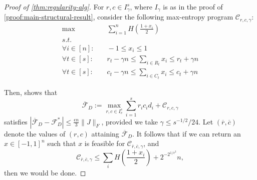 \documentclass[final, 12pt]{colt2018}
\newcommand{\F}{\mathcal{F}}
\theoremstyle{definition}
\theoremstyle{plain}
\begin{document}
\begin{proof}[Proof of \cref{thm:regularity-alg}]
For $r,c \in I^{s}_{\gamma}$, where $I_{\gamma}$ is as in the proof of \cref{proof:main-structural-result}, consider the following max-entropy program $\mathcal{C}_{r,c,\gamma}$: 
\begin{align*}
\max & \quad \sum_{i=1}^{n}H\left(\frac{1+x_{i}}{2}\right)\\
s.t.\\
\forall i\in[n]: & \quad -1\leq x_{i}\leq1 \\
\forall t\in[s]: & \quad r_{t}-\gamma n\leq\sum_{i\in R_{t}}x_{i}\leq r_{t}+\gamma n\\
\forall t\in[s]: & \quad c_{t}-\gamma n\leq\sum_{i\in C_{t}}x_{i}\leq c_{t}+\gamma n
\end{align*}

Then,  shows that  
\[ \overline{\F}_D := \max_{r,c \in I^s_v} \sum_{i = 1}^s r_i c_i d_i + \mathcal{C}_{r,c,\gamma} \]
satisfies $|\overline{\F}_{D} - \F^*_{D}| \leq \frac{\epsilon n}{3}\|J\|_{F}$, provided we take $\gamma \leq s^{-1/2}/24$. Let $(\overline{r},\overline{c})$ denote the values of $(r,c)$ attaining $\overline{\F}_{D}$. It follows that if we can return an $x \in [-1,1]^{n}$ such that $x$ is feasible for $\mathcal{C}_{\overline{r},\overline{c},\gamma}$, and 
$$\mathcal{C}_{\overline{r},\overline{c},\gamma} \leq \sum_{i}H\left(\frac{1+x_i}{2}\right) + 2^{-2^{1/\epsilon^2}}n,$$
then we would be done. 


\end{proof}
\end{document}
